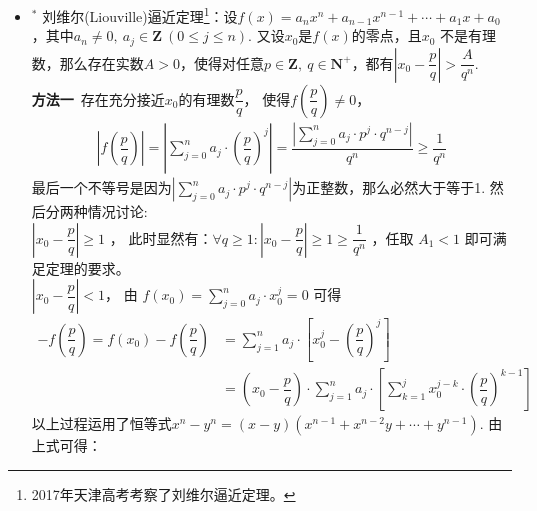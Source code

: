 \begin{itemize}[leftmargin=\inteval{\myitemleftmargin}pt,itemsep=
   \inteval{\myitemitempsep}pt,topsep=\inteval{\myitemtopsep}pt]
\begin{align*}
    \dfrac{(\sqrt{x_2}-\sqrt{x_1})(x_2+\sqrt{x_2x_1}+x_1)}{x_2-x_1}=
    \dfrac{x_2+\sqrt{x_2x_1}+x_1}{\sqrt{x_2}+\sqrt{x_1}} < \dfrac{3}{2}\sqrt{x_2}
\end{align*}
容易验证：$ \dfrac{3}{2}\sqrt{x_1}(\sqrt{x_2}+\sqrt{x_1})<x_2+\sqrt{x_2x_1}+x_1
<\dfrac{3}{2}\sqrt{x_2}(\sqrt{x_2}+\sqrt{x_1}) $.\\
$ \dfrac{n}{m}=-1 $时，
\begin{align*}
    -\dfrac{1}{x_1^2}<\dfrac{\frac{1}{x_2}-\frac{1}{x_1}}{x_2-x_1}=-\dfrac{1}{x_1x_2}<
    -\dfrac{1}{x_2^2}
\end{align*}

\item $^*$ 刘维尔(Liouville)逼近定理\footnote{2017年天津高考考察了刘维尔逼近定理。}：设$ f(x)=a_nx^n+a_{n-1}x^{n-1}+
\cdots+a_1x+a_0 $，其中$ a_n\neq 0,\ a_j\in \textbf{Z}\ 
(0\leq j\leq n) $. 又设$ x_0 $是$ f(x) $的零点，且$ x_0 $
不是有理数，那么存在实数$ A>0 $，使得对任意$ p\in \textbf{Z},\ 
q\in \textbf{N}^+ $，都有$ \left|x_0-\dfrac{p}{q}\right|>
\dfrac{A}{q^n} $.\\
\textbf{方法一}\ 存在充分接近$ x_0 $的有理数$ \dfrac{p}{q} $，
使得$ f\left(\dfrac{p}{q}\right)\neq 0 $，
\begin{align*}
    \left|f\left(\dfrac{p}{q}\right)\right|=\left|\sum_{j=0}^{n}a_{j}\cdot \left(\dfrac{p}{q}\right)^{j}\right|=\dfrac{\left|\sum\limits_{j=0}^{n}a_{j}\cdot p^{j}\cdot q^{n-j}\right|}{q^{n}}\geq \dfrac{1}{q^{n}}
\end{align*}
最后一个不等号是因为$ \left|\sum\limits_{j=0}^{n}a_{j}\cdot p^{j}
\cdot q^{n-j}\right| $为正整数，那么必然大于等于1.
然后分两种情况讨论: \\
 $ \left|x_0-\dfrac{p}{q}\right|\geq 1 $ ，
此时显然有：$ \forall q\geq 1:\left|x_0-\dfrac{p}{q}\right|\geq 1\geq \dfrac{1}{q^{n}} $ ，任取 $ A_{1}<1 $ 即可满足定理的要求。\\
\mycircled{2} $ \left|x_0-\dfrac{p}{q}\right|<1 $，
由 $ f(x_0)=\sum\limits_{j=0}^{n}a_{j}\cdot x_0^{j}=0 $ 可得
\begin{align*}
    -f\left(\dfrac{p}{q}\right)=f(x_0)-f\left(\dfrac{p}{q}\right)
    &=\sum_{j=1}^{n}a_{j}\cdot\left[x_0^{j}-\left(\dfrac{p}{q}
    \right)^{j}\right] \\
    &=\left(x_0-\dfrac{p}{q}\right)\cdot 
    \sum_{j=1}^{n}a_{j}\cdot \left[\sum_{k=1}^{j}x_0^{j-k}\cdot
    \left(\dfrac{p}{q}\right)^{k-1}\right]
\end{align*}
以上过程运用了恒等式$ x^{n}-y^{n}=(x-y)(x^{n-1}+x^{n-2}y+\cdots+y^{n-1}) $. 由上式可得： 

\end{itemize}
